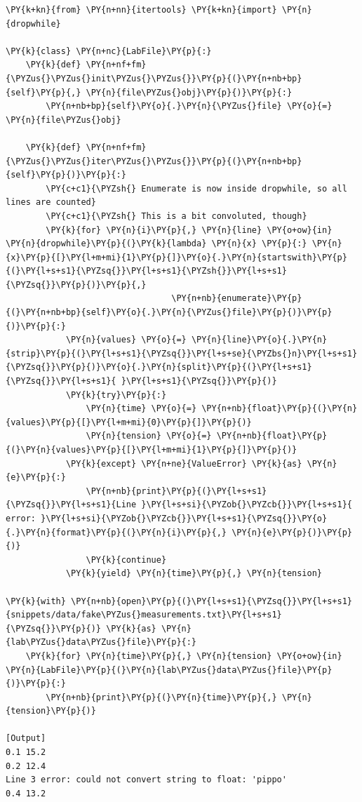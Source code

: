 \begin{Verbatim}[label=\makebox{\url{https://github.com/lucabaldini/cmepda/tree/master/slides/latex/snippets/file\_iterator\_2.py}},commandchars=\\\{\}]
\PY{k+kn}{from} \PY{n+nn}{itertools} \PY{k+kn}{import} \PY{n}{dropwhile}

\PY{k}{class} \PY{n+nc}{LabFile}\PY{p}{:}
    \PY{k}{def} \PY{n+nf+fm}{\PYZus{}\PYZus{}init\PYZus{}\PYZus{}}\PY{p}{(}\PY{n+nb+bp}{self}\PY{p}{,} \PY{n}{file\PYZus{}obj}\PY{p}{)}\PY{p}{:}
        \PY{n+nb+bp}{self}\PY{o}{.}\PY{n}{\PYZus{}file} \PY{o}{=} \PY{n}{file\PYZus{}obj}
       
    \PY{k}{def} \PY{n+nf+fm}{\PYZus{}\PYZus{}iter\PYZus{}\PYZus{}}\PY{p}{(}\PY{n+nb+bp}{self}\PY{p}{)}\PY{p}{:}
        \PY{c+c1}{\PYZsh{} Enumerate is now inside dropwhile, so all lines are counted}
        \PY{c+c1}{\PYZsh{} This is a bit convoluted, though}
        \PY{k}{for} \PY{n}{i}\PY{p}{,} \PY{n}{line} \PY{o+ow}{in} \PY{n}{dropwhile}\PY{p}{(}\PY{k}{lambda} \PY{n}{x} \PY{p}{:} \PY{n}{x}\PY{p}{[}\PY{l+m+mi}{1}\PY{p}{]}\PY{o}{.}\PY{n}{startswith}\PY{p}{(}\PY{l+s+s1}{\PYZsq{}}\PY{l+s+s1}{\PYZsh{}}\PY{l+s+s1}{\PYZsq{}}\PY{p}{)}\PY{p}{,}
                                 \PY{n+nb}{enumerate}\PY{p}{(}\PY{n+nb+bp}{self}\PY{o}{.}\PY{n}{\PYZus{}file}\PY{p}{)}\PY{p}{)}\PY{p}{:}
            \PY{n}{values} \PY{o}{=} \PY{n}{line}\PY{o}{.}\PY{n}{strip}\PY{p}{(}\PY{l+s+s1}{\PYZsq{}}\PY{l+s+se}{\PYZbs{}n}\PY{l+s+s1}{\PYZsq{}}\PY{p}{)}\PY{o}{.}\PY{n}{split}\PY{p}{(}\PY{l+s+s1}{\PYZsq{}}\PY{l+s+s1}{ }\PY{l+s+s1}{\PYZsq{}}\PY{p}{)}
            \PY{k}{try}\PY{p}{:}
                \PY{n}{time} \PY{o}{=} \PY{n+nb}{float}\PY{p}{(}\PY{n}{values}\PY{p}{[}\PY{l+m+mi}{0}\PY{p}{]}\PY{p}{)}
                \PY{n}{tension} \PY{o}{=} \PY{n+nb}{float}\PY{p}{(}\PY{n}{values}\PY{p}{[}\PY{l+m+mi}{1}\PY{p}{]}\PY{p}{)}
            \PY{k}{except} \PY{n+ne}{ValueError} \PY{k}{as} \PY{n}{e}\PY{p}{:}
                \PY{n+nb}{print}\PY{p}{(}\PY{l+s+s1}{\PYZsq{}}\PY{l+s+s1}{Line }\PY{l+s+si}{\PYZob{}\PYZcb{}}\PY{l+s+s1}{ error: }\PY{l+s+si}{\PYZob{}\PYZcb{}}\PY{l+s+s1}{\PYZsq{}}\PY{o}{.}\PY{n}{format}\PY{p}{(}\PY{n}{i}\PY{p}{,} \PY{n}{e}\PY{p}{)}\PY{p}{)}
                \PY{k}{continue}
            \PY{k}{yield} \PY{n}{time}\PY{p}{,} \PY{n}{tension}

\PY{k}{with} \PY{n+nb}{open}\PY{p}{(}\PY{l+s+s1}{\PYZsq{}}\PY{l+s+s1}{snippets/data/fake\PYZus{}measurements.txt}\PY{l+s+s1}{\PYZsq{}}\PY{p}{)} \PY{k}{as} \PY{n}{lab\PYZus{}data\PYZus{}file}\PY{p}{:}
    \PY{k}{for} \PY{n}{time}\PY{p}{,} \PY{n}{tension} \PY{o+ow}{in} \PY{n}{LabFile}\PY{p}{(}\PY{n}{lab\PYZus{}data\PYZus{}file}\PY{p}{)}\PY{p}{:}
        \PY{n+nb}{print}\PY{p}{(}\PY{n}{time}\PY{p}{,} \PY{n}{tension}\PY{p}{)}

[Output]
0.1 15.2
0.2 12.4
Line 3 error: could not convert string to float: 'pippo'
0.4 13.2
\end{Verbatim}